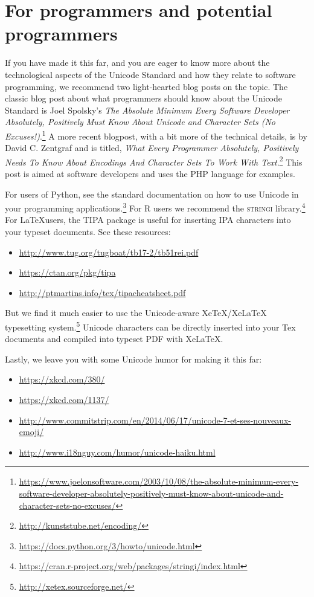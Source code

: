\section{For programmers and potential programmers}
If you have made it this far, and you are eager to know more about the technological aspects of the Unicode Standard and how they relate to software programming, we recommend two light-hearted blog posts on the topic. The classic blog post about what programmers should know about the Unicode Standard is Joel Spolsky's \textit{The Absolute Minimum Every Software Developer Absolutely, Positively Must Know About Unicode and Character Sets (No Excuses!)}.\footnote{\url{https://www.joelonsoftware.com/2003/10/08/the-absolute-minimum-every-software-developer-absolutely-positively-must-know-about-unicode-and-character-sets-no-excuses/}} A more recent blogpost, with a bit more of the technical details, is by David C. Zentgraf and is titled, \textit{What Every Programmer Absolutely, Positively Needs To Know About Encodings And Character Sets To Work With Text}.\footnote{\url{http://kunststube.net/encoding/}} This post is aimed at software developers and uses the PHP language for examples.

For users of Python, see the standard documentation on how to use Unicode in your programming applications.\footnote{\url{https://docs.python.org/3/howto/unicode.html}} For R users we recommend the \textsc{stringi} library.\footnote{\url{https://cran.r-project.org/web/packages/stringi/index.html}} For \LaTeX users, the TIPA package is useful for inserting IPA characters into your typeset documents. See these resources:

\begin{itemize}
	\item \url{http://www.tug.org/tugboat/tb17-2/tb51rei.pdf}
	\item \url{https://ctan.org/pkg/tipa}
	\item \url{http://ptmartins.info/tex/tipacheatsheet.pdf}
\end{itemize}

\noindent But we find it much easier to use the Unicode-aware XeTeX/XeLaTeX typesetting system.\footnote{\url{http://xetex.sourceforge.net/}} Unicode characters can be directly inserted into your Tex documents and compiled into typeset PDF with XeLaTeX.

Lastly, we leave you with some Unicode humor for making it this far:

\begin{itemize}
	\item \url{https://xkcd.com/380/}
	\item \url{https://xkcd.com/1137/}
	\item \url{http://www.commitstrip.com/en/2014/06/17/unicode-7-et-ses-nouveaux-emoji/}
	\item \url{http://www.i18nguy.com/humor/unicode-haiku.html}
\end{itemize}



